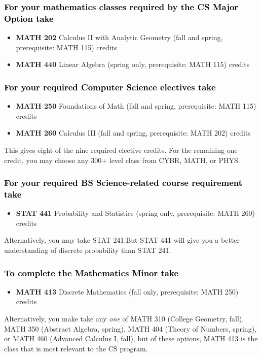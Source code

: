 \documentclass[10pt]{article}
\newenvironment{mypar}[2]
   {\begin{list}{}%
     {\setlength\leftmargin{#1}
     \setlength\rightmargin{#2}}
     \item[]}
   {\end{list}}
\newcommand{\calctwo}{\textbf{MATH 202} Calculus II with Analytic Geometry (fall and spring, prerequisite: MATH 115) \dotfill 5 credits }
\newcommand{\foundations}{\textbf{MATH 250} Foundations of Math (fall and spring, prerequisite: MATH 115)  \dotfill 3 credits}
\newcommand{\calcthree}{\textbf{MATH 260} Calculus III  (fall and spring, prerequisite: MATH 202) \dotfill 5 credits}
\newcommand{\linear}{\textbf{MATH 440} Linear Algebra (spring only, prerequisite: MATH 115) \dotfill 3 credits}
\newcommand{\discrete}{\textbf{MATH 413} Discrete Mathematics  (fall only, prerequisite: MATH 250)\dotfill 3 credits}
\newcommand{\statistics}{\textbf{STAT 441} Probability and Statistics (spring only, prerequisite: MATH 260)  \dotfill  3 credits}
\begin{document}
\subsubsection*{\textcolor{black}{For your mathematics classes required by the CS Major Option take}}
\begin{itemize}
\item \calctwo
\item \linear
\end{itemize}

\subsubsection*{\textcolor{black}{For your required Computer Science electives take}}

\begin{itemize}
\item \foundations
\item \calcthree
\end{itemize}
\vspace{-0.1in}
\begin{mypar}{0.5cm}{0.5cm} This gives eight of the nine required elective credits. For the remaining one credit, you may choose any 300+ level class from CYBR,  MATH, or PHYS.
\end{mypar}
\subsubsection*{\textcolor{black}{For your required BS Science-related course requirement take}}
\begin{itemize}
\item \statistics
\end{itemize}
\vspace{-0.1in}
\begin{mypar}{0.5cm}{0.5cm}Alternatively, you may take STAT 241.But STAT 441 will give you  a  better understanding of discrete probability than STAT 241.
\end{mypar}
\subsubsection*{\textcolor{black}{To complete the Mathematics Minor  take}}

\begin{itemize}
\item \discrete
\end{itemize}
\vspace{-0.1in}
\begin{mypar}{0.5cm}{0.5cm}
Alternatively, you make take any \emph{one} of MATH 310 (College Geometry, fall),  MATH 350 (Abstract Algebra, spring),  MATH 404  (Theory of Numbers, spring), or
MATH 460 (Advanced Calculus I, fall), but of these options, MATH 413 is  the class that is most relevant to the CS program.  \end{mypar}
\end{document}
